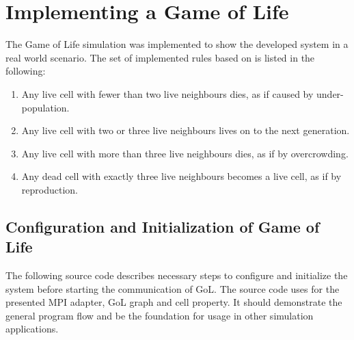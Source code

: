 \section{Implementing a Game of Life}
\label{sec:impl:gol}
The Game of Life simulation was implemented to show the developed
system in a real world scenario. The set of implemented rules based on
\cite{ref:gol_rules} is listed in the following:

\begin{enumerate}
\item Any live cell with fewer than two live neighbours dies, as if caused by under-population.
\item Any live cell with two or three live neighbours lives on to the next generation.
\item Any live cell with more than three live neighbours dies, as if by overcrowding.
\item Any dead cell with exactly three live neighbours becomes a live cell, as if by reproduction.
\end{enumerate}

\subsection{Configuration and Initialization of Game of Life}
The following source code describes necessary steps to configure and
initialize the system before starting the communication of GoL. The
source code uses for the presented MPI adapter, GoL graph and
cell property. It should demonstrate the general program flow and be
the foundation for usage in other simulation applications.

